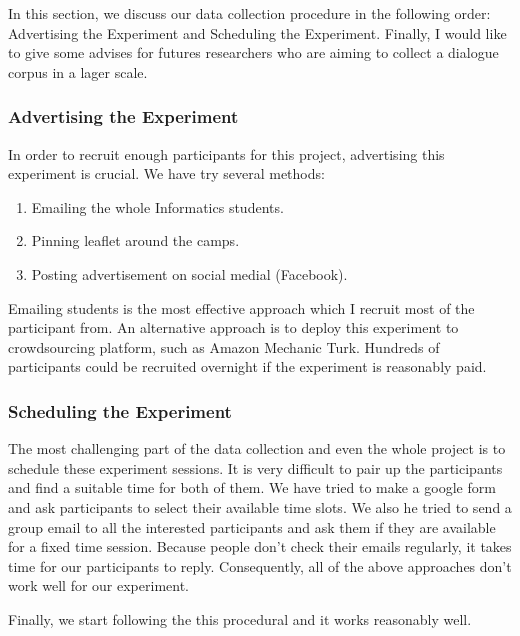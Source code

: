 \documentclass[bsc,frontabs,twoside,singlespacing,parskip,deptreport]{infthesis}     %
\begin{document}
In this section, we discuss our data collection procedure in the following order: Advertising the Experiment and Scheduling the Experiment. Finally, I would like to give some advises for futures researchers who are aiming to collect a dialogue corpus in a lager scale.

\subsubsection*{Advertising the Experiment}

In order to recruit enough participants for this project, advertising this experiment is crucial. We have try several methods:

\begin{enumerate}
   \item Emailing the whole Informatics students.

   \item Pinning leaflet around the camps. 
 
   \item Posting advertisement on social medial (Facebook).
\end{enumerate}

Emailing students is the most effective approach which I recruit most of the participant from. An alternative approach is to deploy this experiment to crowdsourcing platform, such as Amazon Mechanic Turk\cite{mturk}. Hundreds of participants could be recruited overnight if the experiment is reasonably paid.


\subsubsection*{Scheduling the Experiment}

The most challenging part of the data collection and even the whole project is to schedule these experiment sessions. It is very difficult to pair up the participants and find a suitable time for both of them. We have tried to make a google form and ask participants to select their available time slots. We also he tried to send a group email to  all the interested participants and ask them if they are available for a fixed time session. Because people don't check their emails regularly, it takes time for our participants to reply. Consequently, all of the above approaches don't work well for our experiment.

Finally, we start following the this procedural and it works reasonably well.
\end{document}
